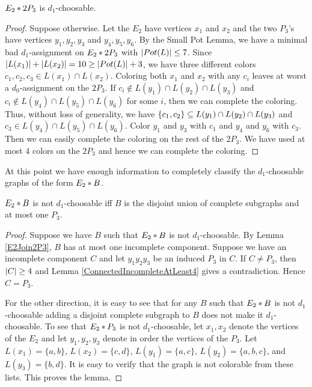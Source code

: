 \begin{lem}\label{E2Join2P3}
$E_2 \mbox{\hspace{2 pt}$\ast$\hspace{2 pt}} 2P_3$ is $d_1$-choosable.
\end{lem}
\begin{proof}
Suppose otherwise. Let the $E_2$ have vertices $x_1$ and $x_2$ and the two
$P_3$'s have vertices $y_1, y_2, y_3$ and $y_4, y_5, y_6$.  By the Small Pot
Lemma, we have a minimal bad $d_1$-assignment on $E_2 \mbox{\hspace{2 pt}$\ast$\hspace{2 pt}} 2P_3$ with
$\left|Pot(L)\right| \leq 7$. Since $\left|L(x_1)\right| + \left|L(x_2)\right| = 10 \geq
\left|Pot(L)\right| + 3$, we have three different colors $c_1, c_2, c_3 \in L(x_1)
\cap L(x_2)$.  Coloring both $x_1$ and $x_2$ with any $c_i$ leaves at worst a
$d_0$-assignment on the $2P_3$.  If $c_i \not \in L(y_1) \cap L(y_2) \cap
L(y_3)$ and $c_i \not \in L(y_4) \cap L(y_5) \cap L(y_6)$ for some $i$, then we
can complete the coloring.  Thus, without loss of generality, we have
$\left\{ c_1, c_2 \right\} \subseteq  L(y_1) \cap L(y_2) \cap L(y_3)$ and $c_3 \in
L(y_4) \cap L(y_5) \cap L(y_6)$.  Color $y_1$ and $y_3$ with $c_1$ and $y_4$
and $y_6$ with $c_3$.  Then we can easily complete the coloring on the rest of
the $2P_3$.  We have used at most $4$ colors on the $2P_3$ and hence we can
complete the coloring.
\end{proof}

At this point we have enough information to completely classify the $d_1$-choosable graphs of the form $E_2 \mbox{\hspace{2 pt}$\ast$\hspace{2 pt}} B$.

\begin{lem}\label{E2Classification}
$E_2 \mbox{\hspace{2 pt}$\ast$\hspace{2 pt}} B$ is not $d_1$-choosable iff $B$ is the disjoint union of complete subgraphs and at most one $P_3$.
\end{lem}
\begin{proof}
Suppose we have $B$ such that $E_2 \mbox{\hspace{2 pt}$\ast$\hspace{2 pt}} B$ is not $d_1$-choosable. By Lemma
\ref{E2Join2P3}, $B$ has at most one incomplete component.  Suppose we have an
incomplete component $C$ and let $y_1y_2y_3$ be an induced $P_3$ in $C$.  If $C \neq P_3$, then $\left|C\right| \geq 4$ and Lemma \ref{ConnectedIncompleteAtLeast4} gives a contradiction.  Hence $C = P_3$.

For the other direction, it is easy to see that for any $B$ such that $E_2 \mbox{\hspace{2 pt}$\ast$\hspace{2 pt}} B$ is not $d_1$-choosable adding a disjoint complete subgraph to $B$ does not make it $d_1$-choosable.  
To see that $E_2 \mbox{\hspace{2 pt}$\ast$\hspace{2 pt}} P_3$ is not $d_1$-choosable, let $x_1,x_2$ denote
the vertices of the $E_2$ and let $y_1,y_2,y_3$ denote in order the vertices of
the $P_3$.  Let $L(x_1)=\{a,b\}$, $L(x_2)=\{c,d\}$, $L(y_1)=\{a,c\}$,
$L(y_2)=\{a,b,c\}$, and $L(y_3)=\{b,d\}$.  It is easy to verify that the graph
is not colorable from these lists.  This proves the lemma.
\end{proof}

